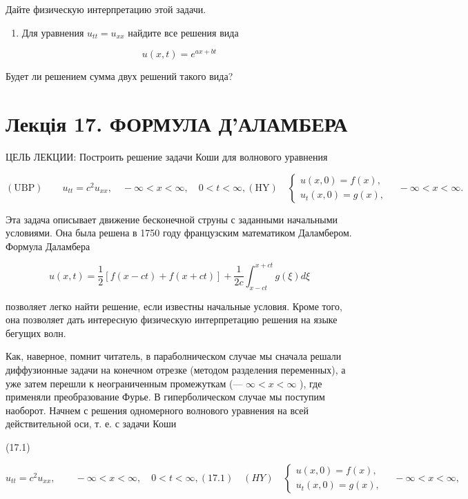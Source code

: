 \documentclass[
  ukrainian,
]{article}
\providecommand{\tightlist}{%
  \setlength{\itemsep}{0pt}\setlength{\parskip}{0pt}}
\begin{document}
Дайте физическую интерпретацию этой задачи.

\begin{enumerate}
\def\labelenumi{\arabic{enumi}.}
\setcounter{enumi}{3}
\tightlist
\item
  Для уравнения \(u_{tt} = u_{xx}\) найдите все решения вида
\end{enumerate}

\[
u(x, t) = e^{ax+bt}
\]

Будет ли решением сумма двух решений такого вида?

\section{Лекція 17. ФОРМУЛА
Д'АЛАМБЕРА}\label{ux43bux435ux43aux446ux456ux44f-17.-ux444ux43eux440ux43cux443ux43bux430-ux434ux430ux43bux430ux43cux431ux435ux440ux430}

ЦЕЛЬ ЛЕКЦИИ: Построить решение задачи Коши для волнового уравнения

\[
(\text{UBP}) \qquad u_{tt} = c^2 u_{xx}, \quad -\infty < x < \infty, \quad 0 < t < \infty,
(\text{HY}) \quad \begin{cases} u(x, 0) = f(x), \\ u_t(x, 0) = g(x), \end{cases} \quad -\infty < x < \infty.
\]

Эта задача описывает движение бесконечной струны с заданными начальными
условиями. Она была решена в 1750 году французским математиком
Даламбером. Формула Даламбера

\[
u(x, t) = \frac{1}{2} [f(x - ct) + f(x + ct)] + \frac{1}{2c} \int_{x-ct}^{x+ct} g(\xi) d\xi
\]

позволяет легко найти решение, если известны начальные условия. Кроме
того, она позволяет дать интересную физическую интерпретацию решения на
языке бегущих волн.

Как, наверное, помнит читатель, в параболническом случае мы сначала
решали диффузионные задачи на конечном отрезке (методом разделения
переменных), а уже затем перешли к неограниченным промежуткам (---
\(\infty < x < \infty\) ), где применяли преобразование Фурье. В
гиперболическом случае мы поступим наоборот. Начнем с решения
одномерного волнового уравнения на всей действительной оси, т. е. с
задачи Коши

(17.1)

\[
u_{tt} = c^{2}u_{xx}, \qquad -\infty < x < \infty, \quad 0 < t < \infty,
(17.1) \quad (HY) \quad \begin{cases} u(x, 0) = f(x), \\ u_{t}(x, 0) = g(x), \end{cases} \quad -\infty < x < \infty,
\]
\end{document}
